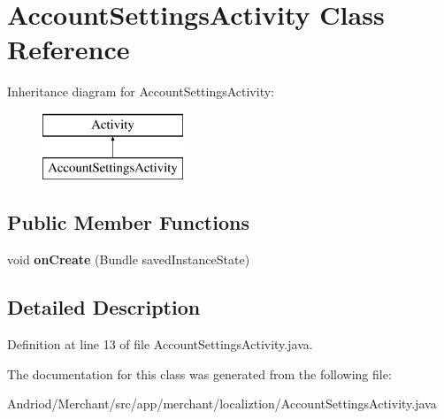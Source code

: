 \hypertarget{classapp_1_1merchant_1_1localiztion_1_1_account_settings_activity}{\section{Account\-Settings\-Activity Class Reference}
\label{classapp_1_1merchant_1_1localiztion_1_1_account_settings_activity}
}
Inheritance diagram for Account\-Settings\-Activity\-:\begin{figure}[H]
\begin{center}
\leavevmode
\includegraphics[height=2.000000cm]{classapp_1_1merchant_1_1localiztion_1_1_account_settings_activity}
\end{center}
\end{figure}
\subsection*{Public Member Functions}
\begin{DoxyCompactItemize}
\item 
\hypertarget{classapp_1_1merchant_1_1localiztion_1_1_account_settings_activity_a85e87cb5ced88dff7c8173ecc4f636d1}{void {\bfseries on\-Create} (Bundle saved\-Instance\-State)}\label{classapp_1_1merchant_1_1localiztion_1_1_account_settings_activity_a85e87cb5ced88dff7c8173ecc4f636d1}

\end{DoxyCompactItemize}


\subsection{Detailed Description}


Definition at line 13 of file Account\-Settings\-Activity.\-java.



The documentation for this class was generated from the following file\-:\begin{DoxyCompactItemize}
\item 
Andriod/\-Merchant/src/app/merchant/localiztion/Account\-Settings\-Activity.\-java\end{DoxyCompactItemize}
